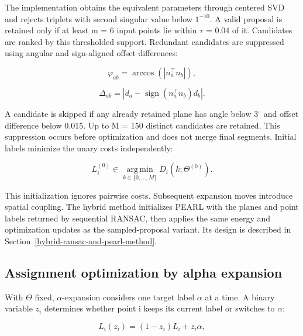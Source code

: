 The implementation obtains the equivalent parameters through centered SVD and rejects triplets with second singular value below \(1^{-10}\). A valid proposal is retained only if at least m = 6 input points lie within \(\tau\) = 0.04 of it. Candidates are ranked by this thresholded support. Redundant candidates are suppressed using angular and sign-aligned offset differences:

\begin{equation}
\varphi_{ab}=\arccos(|n_a^\top n_b|),
\label{eq:21}
\end{equation}

\begin{equation}
\Delta_{ab}=|d_a-\operatorname{sign}(n_a^\top n_b)d_b|.
\label{eq:22}
\end{equation}

A candidate is skipped if any already retained plane has angle below 3\({}^\circ\) and offset difference below 0.015. Up to M = 150 distinct candidates are retained. This suppression occurs before optimization and does not merge final segments. Initial labels minimize the unary costs independently:

\begin{equation}
L_i^{(0)}\in\operatorname*{arg\,min}_{k\in\{0,\ldots,M\}}D_i(k;\Theta^{(0)}).
\label{eq:23}
\end{equation}

This initialization ignores pairwise costs. Subsequent expansion moves introduce spatial coupling. The hybrid method initializes PEARL with the planes and point labels returned by sequential RANSAC, then applies the same energy and optimization updates as the sampled-proposal variant. Its design is described in Section~\ref{hybrid-ransac-and-pearl-method}.

\subsection{Assignment optimization by alpha expansion}\label{assignment-optimization-by-alpha-expansion}

With \(\Theta\) fixed, \(\alpha\)-expansion \cite{boykov2001graphcuts} considers one target label \(\alpha\) at a time. A binary variable \(z_{i}\) determines whether point i keeps its current label or switches to \(\alpha\):

\begin{equation}
L_i(z_i)=(1-z_i)L_i+z_i\alpha,
\label{eq:24}
\end{equation}

